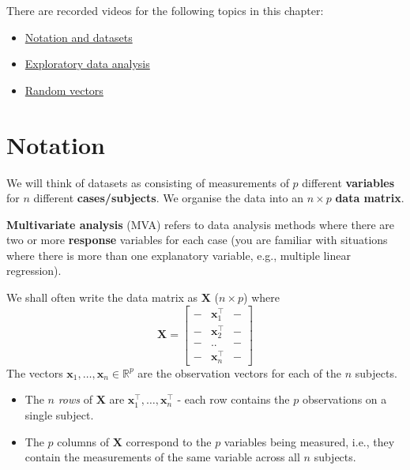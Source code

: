 \documentclass[
]{book}
\providecommand{\tightlist}{%
  \setlength{\itemsep}{0pt}\setlength{\parskip}{0pt}}
\theoremstyle{definition}
\theoremstyle{definition}
\theoremstyle{definition}
\theoremstyle{definition}
\theoremstyle{remark}
\begin{document}
There are recorded videos for the following topics in this chapter:

\begin{itemize}
\tightlist
\item
  \href{https://mediaspace.nottingham.ac.uk/media/Notation+and+Datasets/1_p2nas9i4}{Notation and datasets}
\item
  \href{https://mediaspace.nottingham.ac.uk/media/Exploratory+data+analysis/1_seh9o28a}{Exploratory data analysis}
\item
  \href{https://mediaspace.nottingham.ac.uk/media/Random+Vectors/1_fpq4r9wh}{Random vectors}
\end{itemize}

\hypertarget{notation}{%
\section{Notation}\label{notation}}

We will think of datasets as consisting of measurements of \(p\) different \textbf{variables} for \(n\) different \textbf{cases/subjects}. We organise the data into an \(n \times p\) \textbf{data matrix}.

\textbf{Multivariate analysis} (MVA) refers to data analysis methods where there are two or more \textbf{response} variables for each case (you are familiar with situations where there is more than one explanatory variable, e.g., multiple linear regression).

We shall often write the data matrix as \(\mathbf X\) (\(n \times p\)) where
\[
{\mathbf X}=\left[ \begin{array}{ccc}
- &\mathbf x_1^\top&-\\
- &\mathbf x_2^\top&-\\
- &..&-\\
- &\mathbf x_n^\top&-
\end{array}\right ]
\]
The vectors \(\mathbf x_1, \ldots , \mathbf x_n \in \mathbb{R}^p\) are the observation vectors for each of the \(n\) subjects.

\begin{itemize}
\tightlist
\item
  The \(n\) \emph{rows} of \(\mathbf X\) are \(\mathbf x_1^\top, \ldots , \mathbf x_n^\top\) - each row contains the \(p\) observations on a single subject.
\item
  The \(p\) columns of \(\mathbf X\) correspond to the \(p\) variables being measured, i.e., they contain the measurements of the same variable across all \(n\) subjects.
\end{itemize}
\end{document}
